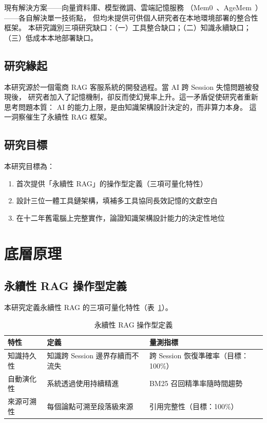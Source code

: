 \documentclass[conference]{IEEEtran}
\begin{document}
現有解決方案——向量資料庫、模型微調、雲端記憶服務
（Mem0~\cite{chhikara2025mem0}、AgeMem~\cite{yu2026agemem}）——各自解決單一技術點，
但均未提供可供個人研究者在本地環境部署的整合性框架。
本研究識別三項研究缺口：（一）工具整合缺口；（二）知識永續缺口；
（三）低成本本地部署缺口。

\subsection{研究緣起}

本研究源於一個電商 RAG 客服系統的開發過程。當 AI 跨 Session 失憶問題被發現後，
研究者加入了記憶機制，卻反而使幻覺率上升。這一矛盾促使研究者重新思考問題本質：
AI 的能力上限，是由知識架構設計決定的，而非算力本身。
這一洞察催生了永續性 RAG 框架。

\subsection{研究目標}

本研究目標為：
\begin{enumerate}
  \item 首次提供「永續性 RAG」的操作型定義（三項可量化特性）
  \item 設計三位一體工具鏈架構，填補多工具協同長效記憶的文獻空白
  \item 在十二年舊電腦上完整實作，論證知識架構設計能力的決定性地位
\end{enumerate}

\section{底層原理}

\subsection{永續性 RAG 操作型定義}

本研究定義永續性 RAG 的三項可量化特性（表~\ref{tab:definition}）。

\begin{table}[ht]
\caption{永續性 RAG 操作型定義}
\label{tab:definition}
\centering
\begin{tabular}{p{1.6cm}p{2.8cm}p{2.8cm}}
\toprule
\textbf{特性} & \textbf{定義} & \textbf{量測指標} \\
\midrule
知識持久性 &
  知識跨 Session 邊界存續而不流失 &
  跨 Session 恢復準確率（目標：100\%）\\[4pt]
自動演化性 &
  系統透過使用持續精進 &
  BM25 召回精準率隨時間趨勢 \\[4pt]
來源可溯性 &
  每個論點可溯至段落級來源 &
  引用完整性（目標：100\%）\\
\bottomrule
\end{tabular}
\end{table}
\end{document}
